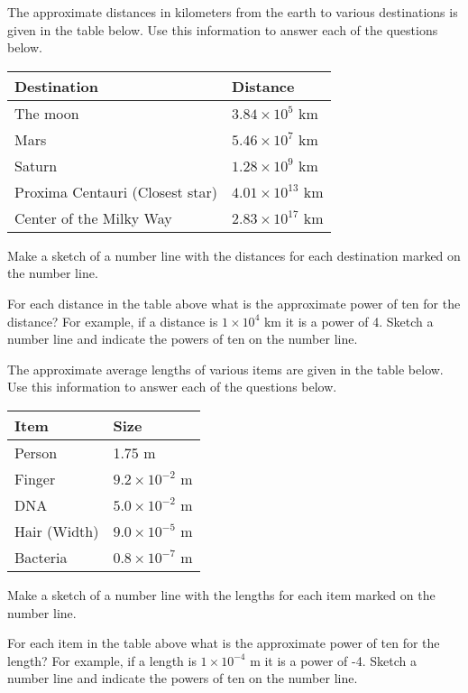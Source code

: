 \begin{problem}
\item The approximate distances in kilometers from the earth to
  various destinations is given in the table below. Use this
  information to answer each of the questions below.

  \begin{tabular}{ll}
    Destination & Distance \\ \hline
    The moon & $3.84 \times 10^5$ km \\
    Mars &  $5.46 \times 10^7$ km \\
    Saturn & $1.28 \times 10^9$ km \\
    Proxima Centauri (Closest star) & $4.01 \times 10^{13}$ km \\
    Center of the Milky Way & $2.83 \times 10^{17}$ km
  \end{tabular}

  \begin{subproblem}
    \item Make a sketch of a number line with the distances for each
      destination marked on the number line.
      \vfill
    \item For each distance in the table above what is the approximate
      power of ten for the distance? For example, if a distance is
      $1\times 10^4$ km it is a power of 4. Sketch a number line and
      indicate the powers of ten on the number line.
      \vfill
  \end{subproblem}

\clearpage

The approximate average lengths of various items are given in the table
below. Use this information to answer each of the questions below.

  \begin{tabular}{ll}
    Item & Size \\ \hline
    Person & 1.75 m \\
    Finger & $9.2 \times 10^{-2}$ m\\
    DNA & $ 5.0 \times 10^{-2}$ m \\
    Hair (Width) & $ 9.0\times 10^{-5}$ m \\
    Bacteria & $ 0.8 \times 10^{-7}$ m\\
  \end{tabular}

  \begin{subproblem}
    \item Make a sketch of a number line with the lengths for each
      item  marked on the number line.
      \vfill
    \item For each item in the table above what is the approximate
      power of ten for the length? For example, if a length is
      $1\times 10^{-4}$ m it is a power of -4. Sketch a number line
      and indicate the powers of ten on the number line.
      \vfill
  \end{subproblem}


\end{problem}
